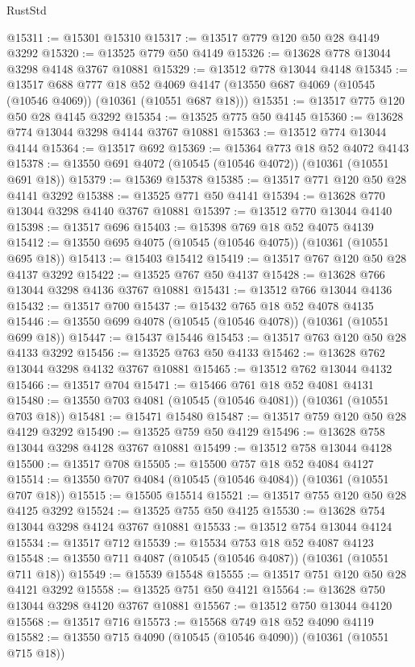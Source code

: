 \begin{lexlean}{RustStd}
\begin{coremodule}
@15311 := @15301 @15310
@15317 := @13517 @779 @120 @50 @28 @4149 @3292
@15320 := @13525 @779 @50 @4149
@15326 := @13628 @778 @13044 @3298 @4148 @3767 @10881
@15329 := @13512 @778 @13044 @4148
@15345 := @13517
    @688
    @777
    @18
    @52
    @4069
    @4147
    (@13550 @687 @4069 (@10545 (@10546 @4069)) (@10361 (@10551 @687 @18)))
@15351 := @13517 @775 @120 @50 @28 @4145 @3292
@15354 := @13525 @775 @50 @4145
@15360 := @13628 @774 @13044 @3298 @4144 @3767 @10881
@15363 := @13512 @774 @13044 @4144
@15364 := @13517 @692
@15369 := @15364 @773 @18 @52 @4072 @4143
@15378 := @13550 @691 @4072 (@10545 (@10546 @4072)) (@10361 (@10551 @691 @18))
@15379 := @15369 @15378
@15385 := @13517 @771 @120 @50 @28 @4141 @3292
@15388 := @13525 @771 @50 @4141
@15394 := @13628 @770 @13044 @3298 @4140 @3767 @10881
@15397 := @13512 @770 @13044 @4140
@15398 := @13517 @696
@15403 := @15398 @769 @18 @52 @4075 @4139
@15412 := @13550 @695 @4075 (@10545 (@10546 @4075)) (@10361 (@10551 @695 @18))
@15413 := @15403 @15412
@15419 := @13517 @767 @120 @50 @28 @4137 @3292
@15422 := @13525 @767 @50 @4137
@15428 := @13628 @766 @13044 @3298 @4136 @3767 @10881
@15431 := @13512 @766 @13044 @4136
@15432 := @13517 @700
@15437 := @15432 @765 @18 @52 @4078 @4135
@15446 := @13550 @699 @4078 (@10545 (@10546 @4078)) (@10361 (@10551 @699 @18))
@15447 := @15437 @15446
@15453 := @13517 @763 @120 @50 @28 @4133 @3292
@15456 := @13525 @763 @50 @4133
@15462 := @13628 @762 @13044 @3298 @4132 @3767 @10881
@15465 := @13512 @762 @13044 @4132
@15466 := @13517 @704
@15471 := @15466 @761 @18 @52 @4081 @4131
@15480 := @13550 @703 @4081 (@10545 (@10546 @4081)) (@10361 (@10551 @703 @18))
@15481 := @15471 @15480
@15487 := @13517 @759 @120 @50 @28 @4129 @3292
@15490 := @13525 @759 @50 @4129
@15496 := @13628 @758 @13044 @3298 @4128 @3767 @10881
@15499 := @13512 @758 @13044 @4128
@15500 := @13517 @708
@15505 := @15500 @757 @18 @52 @4084 @4127
@15514 := @13550 @707 @4084 (@10545 (@10546 @4084)) (@10361 (@10551 @707 @18))
@15515 := @15505 @15514
@15521 := @13517 @755 @120 @50 @28 @4125 @3292
@15524 := @13525 @755 @50 @4125
@15530 := @13628 @754 @13044 @3298 @4124 @3767 @10881
@15533 := @13512 @754 @13044 @4124
@15534 := @13517 @712
@15539 := @15534 @753 @18 @52 @4087 @4123
@15548 := @13550 @711 @4087 (@10545 (@10546 @4087)) (@10361 (@10551 @711 @18))
@15549 := @15539 @15548
@15555 := @13517 @751 @120 @50 @28 @4121 @3292
@15558 := @13525 @751 @50 @4121
@15564 := @13628 @750 @13044 @3298 @4120 @3767 @10881
@15567 := @13512 @750 @13044 @4120
@15568 := @13517 @716
@15573 := @15568 @749 @18 @52 @4090 @4119
@15582 := @13550 @715 @4090 (@10545 (@10546 @4090)) (@10361 (@10551 @715 @18))

\end{coremodule}
\end{lexlean}
